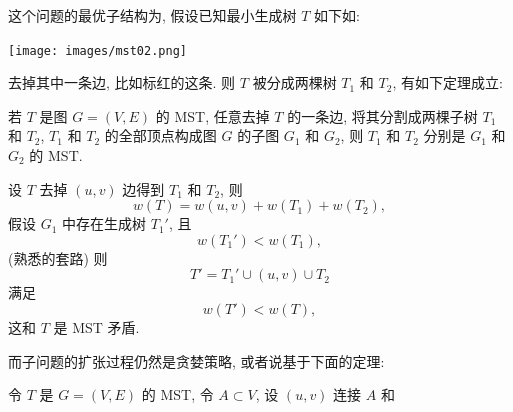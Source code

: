 \documentclass[a4paper]{ctexart}
\newcommand{\hl}[1]
{\noindent {\bf {#1}}}
\theoremstyle{definition}
\theoremstyle{definition}
\begin{document}
这个问题的最优子结构为, 假设已知最小生成树 $T$ 如下如: 
\begin{center}
  \texttt{[image: images/mst02.png]}
  
\end{center}

去掉其中一条边, 比如标红的这条. 则 $T$ 被分成两棵树 $T_1$ 和 $T_2$, 有如下定理成立:

\hl{定理} 若 $T$ 是图 $G = (V, E)$ 的 MST, 任意去掉 $T$ 的一条边, 将其分割成两棵子树 $T_1$ 和 $T_2$,  
$T_1$ 和 $T_2$ 的全部顶点构成图 $G$ 的子图 $G_1$ 和 $G_2$, 则 $T_1$ 和 $T_2$ 分别是 $G_1$ 和 $G_2$ 的 MST.

\hl{证明} 设 $T$ 去掉 $(u, v)$ 边得到 $T_1$ 和 $T_2$, 则
$$
w(T) = w(u, v) + w(T_1) + w(T_2),
$$
假设 $G_1$ 中存在生成树 $T_1'$, 且 
$$
w(T_1') < w(T_1),
$$
(熟悉的套路) 则
$$
T' = T_1' \cup (u, v) \cup T_2
$$
满足
$$
w(T') < w(T),
$$
这和 $T$ 是 MST 矛盾.

而子问题的扩张过程仍然是贪婪策略, 或者说基于下面的定理:

\hl{定理} 令 $T$ 是 $G = (V, E)$ 的 MST, 令 $A \subset V$, 设 $(u, v)$ 连接 $A$ 和 






\end{document}
